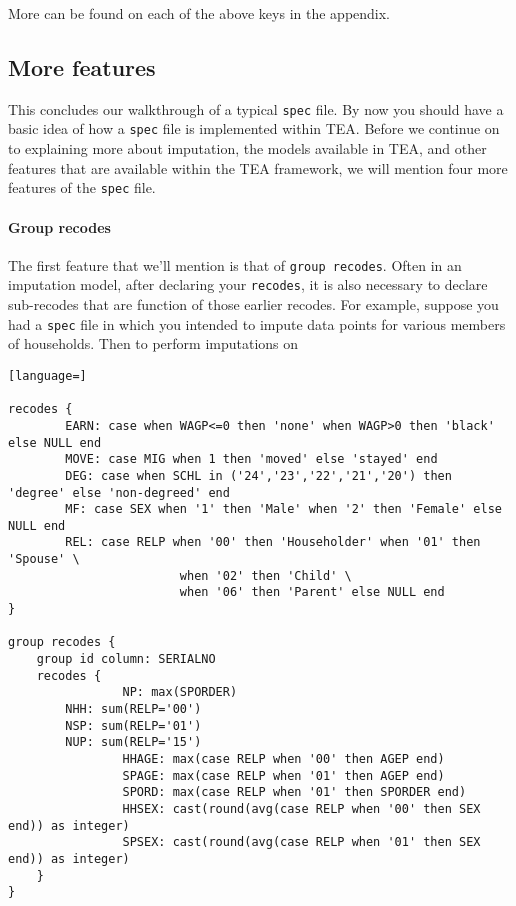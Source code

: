 \documentclass{article}
\begin{document}
More can be found on each of the above keys in the appendix.

\subsection{More features}
This concludes our walkthrough of a typical {\tt spec} file. By now you should have a basic idea of 
how a {\tt spec} file is implemented within TEA. Before we continue on to explaining more about imputation, 
the models available in TEA, and other features that are available within the TEA framework, we will mention 
four more features of the {\tt spec} file.


\paragraph{Group recodes} The first feature that we'll mention is that of {\tt group recodes}. 
Often in an imputation model, after declaring your {\tt recodes}, it is also necessary to declare 
sub-recodes that are function of those earlier recodes. For example, suppose you had a {\tt spec} file 
in which you intended to impute data points for various members of households. Then to perform imputations 
on 


\begin{lstlisting}[language=]

recodes {
        EARN: case when WAGP<=0 then 'none' when WAGP>0 then 'black' else NULL end
        MOVE: case MIG when 1 then 'moved' else 'stayed' end
        DEG: case when SCHL in ('24','23','22','21','20') then 'degree' else 'non-degreed' end
        MF: case SEX when '1' then 'Male' when '2' then 'Female' else NULL end
        REL: case RELP when '00' then 'Householder' when '01' then 'Spouse' \
                        when '02' then 'Child' \
                        when '06' then 'Parent' else NULL end
}

group recodes {
    group id column: SERIALNO
    recodes {
                NP: max(SPORDER)
        NHH: sum(RELP='00')
        NSP: sum(RELP='01')
        NUP: sum(RELP='15')
                HHAGE: max(case RELP when '00' then AGEP end)
                SPAGE: max(case RELP when '01' then AGEP end)
                SPORD: max(case RELP when '01' then SPORDER end)
                HHSEX: cast(round(avg(case RELP when '00' then SEX end)) as integer)
                SPSEX: cast(round(avg(case RELP when '01' then SEX end)) as integer)
    }
}



\end{lstlisting}
\end{document}
